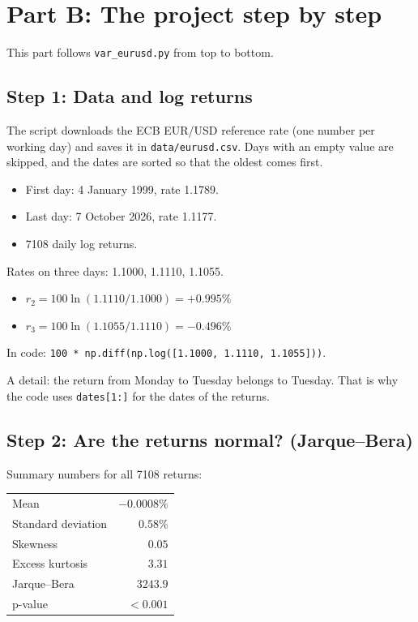 \documentclass[11pt,a4paper]{article}
\newcommand{\code}[1]{\texttt{#1}}
\begin{document}
\section{Part B: The project step by step}\label{sec:project}

This part follows \code{var\_eurusd.py} from top to bottom.

\subsection{Step 1: Data and log returns}

The script downloads the ECB EUR/USD reference rate (one number per working
day) and saves it in \code{data/eurusd.csv}. Days with an empty value are
skipped, and the dates are sorted so that the oldest comes first.

\begin{itemize}
  \item First day: 4 January 1999, rate 1.1789.
  \item Last day: 7 October 2026, rate 1.1177.
  \item 7108 daily log returns.
\end{itemize}

\begin{example}
Rates on three days: 1.1000, 1.1110, 1.1055.
\begin{itemize}
  \item $r_2 = 100\ln(1.1110/1.1000) = +0.995\%$
  \item $r_3 = 100\ln(1.1055/1.1110) = -0.496\%$
\end{itemize}
In code: \code{100 * np.diff(np.log([1.1000, 1.1110, 1.1055]))}.
\end{example}

A detail: the return from Monday to Tuesday belongs to Tuesday. That is why
the code uses \code{dates[1:]} for the dates of the returns.

\subsection{Step 2: Are the returns normal? (Jarque--Bera)}

Summary numbers for all 7108 returns:

\begin{center}
\begin{tabular}{lr}
\toprule
Mean & $-0.0008\%$ \\
Standard deviation & $0.58\%$ \\
Skewness & $0.05$ \\
Excess kurtosis & $3.31$ \\
Jarque--Bera & $3243.9$ \\
p-value & $< 0.001$ \\
\bottomrule
\end{tabular}
\end{center}
\end{document}
